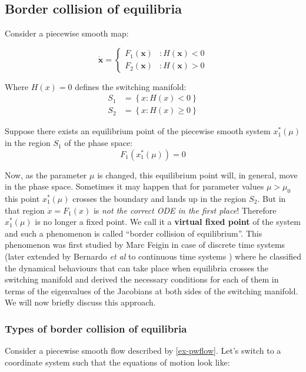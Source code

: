 \documentclass{book}
\renewcommand{\(}{\begin{columns}}
\renewcommand{\)}{\end{columns}}
\newcommand{\<}[1]{\begin{column}{#1}}
\renewcommand{\>}{\end{column}}
\newcommand{\bb}[1]{\textbf{#1}}
\begin{document}
\subsection{Border collision of equilibria}
Consider a piecewise smooth map:

\begin{equation}
\label{ex-pwflow}
   \dot{\mathbf{x}} = \left\{
     \begin{array}{lr}
       F_1(\mathbf{x}) & : H(\mathbf{x})<0\\
       F_2(\mathbf{x}) & : H(\mathbf{x})>0
     \end{array}
   \right.
\end{equation}

Where $H(x)=0$ defines the switching manifold:
\begin{align*}
S_1&=\left\{x:H(x)<0\right\}\\
S_2&=\left\{x:H(x)\geq0\right\}
\end{align*}

Suppose there exists an equilibrium point of the 
piecewise smooth system $x_1^*(\mu)$ in the region $S_1$ of the phase space:
\[
F_1(x_1^*(\mu))=0
\]


Now, as the parameter $\mu$ is changed, this equilibrium point will, in general, move in the phase 
space.  Sometimes it may happen that for parameter values $\mu>\mu_0$ this point $x_1^*(\mu)$ crosses the 
boundary and lands up in the region $S_2$.  But in that region $\dot{x}=F_1(x)$ 
is \emph{not the correct ODE in the first place}! Therefore $x_1^*(\mu)$ is no longer 
a fixed point.  We call it a \bb{virtual fixed point}  of the system and such a phenomenon is called 
``border collision of equilibrium''. This phenomenon was first studied by Marc 
Feigin in case of discrete time systems \cite{feigin-1999}(later extended by 
Bernardo \emph{et al} to continuous time systems \cite{bernardo-c-cases}) where he classified the dynamical 
behaviours that can take place when equilibria crosses the switching manifold and 
 derived the necessary conditions for each of them in
terms of the eigenvalues of the Jacobians at both sides of the switching 
manifold. We will now briefly discuss this approach.  

\subsubsection{Types of border collision of equilibria}
Consider a piecewise smooth flow described by \eqref{ex-pwflow}. Let's switch 
to a coordinate system such that the equations of motion look like:
\end{document}
